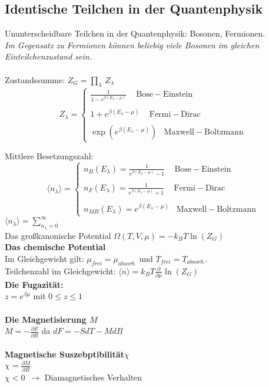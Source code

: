 \documentclass[a4paper,11pt]{scrartcl}
\begin{document}
\subsection{Identische Teilchen in der Quantenphysik}
Ununterscheidbare Teilchen in der Quantenphysik: Bosonen, Fermionen.\\
\textit{Im Gegensatz zu Fermionen können beliebig viele Bosonen im gleichen Einteilchenzustand sein.}\\
\\
Zustandssumme: $Z_G = \prod_{\lambda} \, Z_{\lambda}$
\begin{equation}
  Z_{\lambda} = \left\{ \begin{array}{c} \frac{1}{1-e^{\beta (E_{\lambda}-\mu)}} \,\,\,\,\,\,\, \mathrm{Bose-Einstein} \\ \\  1+e^{\beta (E_{\lambda}-\mu)}\,\,\,\,\,\,\, \mathrm{Fermi-Dirac} \\ \\
  \exp \left(e^{\beta (E_{\lambda}-\mu)} \right) \,\,\,\,\, \mathrm{Maxwell-Boltzmann}
  \end{array} \right.
\end{equation}

Mittlere Besetzungszahl: 
\begin{equation}
  \langle n_{\lambda} \rangle = \left\{ \begin{array}{c} n_B (E_{\lambda}) = \frac{1}{e^{\beta (E_{\lambda}-\mu)}-1} \,\,\,\,\,\,\, \mathrm{Bose-Einstein} \\ \\  n_F (E_{\lambda}) = \frac{1}{e^{\beta (E_{\lambda}-\mu)}+1}\,\,\,\,\,\,\, \mathrm{Fermi-Dirac} \\ \\
  n_{MB} (E_{\lambda}) = e^{\beta (E_{\lambda}-\mu)} \,\,\,\,\, \mathrm{Maxwell-Boltzmann}
  \end{array} \right.
\end{equation}
$\langle n_{\lambda} \rangle = \sum_{n_{\lambda}= 0}^{\infty}$\\
Das großkanonische Potential $\Omega(T,V,\mu) = - k_B T \ln(Z_G)$\\

\textbf{Das chemische Potential}\\
Im Gleichgewicht gilt: $\mu_{frei}= \mu_{absorb.}$ und $T_{frei} = T_{absorb.}$.\\
Teilchenzahl im Gleichgewicht: $\langle n \rangle = k_B T \frac{\partial }{\partial \mu} \ln(Z_G)$
\\
\textbf{Die Fugazität:}\\
$z = e^{\beta \mu}$ mit $0 \leq z \leq 1$\\
\\
\textbf{Die Magnetisierung $M$}\\
$M= -\frac{\partial F}{\partial B}$ da $dF =-S dT - MdB$\\
\\
\textbf{Magnetische Suszebptibilität$ \chi$}\\
$\chi = \frac{\partial M}{\partial B}$\\
$\chi < 0 \,\,\, \rightarrow$ Diamagnetisches Verhalten
\end{document}
